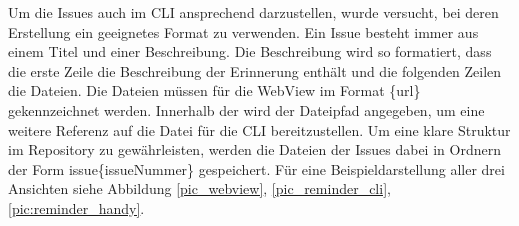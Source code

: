 \newline
\myNewSection
Um die Issues auch im CLI ansprechend darzustellen, wurde versucht, bei deren Erstellung ein geeignetes Format zu verwenden.%
\newline%
Ein Issue besteht immer aus einem Titel und einer Beschreibung. Die Beschreibung wird so formatiert, dass die erste Zeile die Beschreibung der Erinnerung enthält und die folgenden Zeilen die Dateien.%
\newline%
Die Dateien müssen für die WebView im Format \glqq [ ]\{url\}\grqq{} gekennzeichnet werden. Innerhalb der \glqq[ ]\grqq{} wird der Dateipfad angegeben, um eine weitere Referenz auf die Datei für die CLI bereitzustellen. %
Um eine klare Struktur im Repository zu gewährleisten, werden die Dateien der Issues dabei in Ordnern der Form \glqq issue\{issueNummer\}\grqq{} gespeichert.%
\newline%
Für eine Beispieldarstellung aller drei Ansichten siehe Abbildung \ref{pic_webview}, \ref{pic_reminder_cli}, \ref{pic:reminder_handy}.
\myComment{

%
 

}